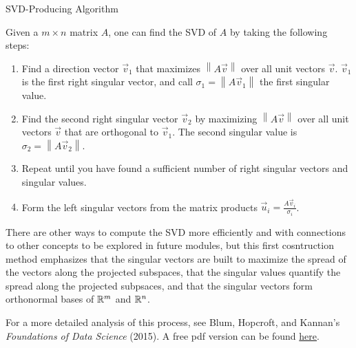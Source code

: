 \documentclass{ximera}
\begin{document}
\begin{theorem}{SVD-Producing Algorithm}

  Given a $m\times n$ matrix $A$, one can find the SVD of $A$ by taking the following steps:

  \begin{enumerate}
    \item Find a direction vector $\vec{v}_1$ that maximizes $\left\|A\vec{v}\right\|$ over all unit vectors $\vec{v}$. $\vec{v}_1$ is the first right singular vector, and call $\sigma_1=\left\|A\vec{v}_1\right\|$ the first singular value. 
    \item Find the second right singular vector $\vec{v}_2$ by maximizing $\left\|A\vec{v}\right\|$ over all unit vectors $\vec{v}$ that are orthogonal to $\vec{v}_1$. The second singular value is $\sigma_2=\left\|A\vec{v}_2\right\|$. 
    \item Repeat until you have found a sufficient number of right singular vectors and singular values.
    \item Form the left singular vectors from the matrix products $\vec{u}_i=\frac{A\vec{v}_i}{\sigma_i}$.
  \end{enumerate}

  There are other ways to compute the SVD more efficiently and with connections to other concepts to be explored in future modules, but this first cosntruction method emphasizes that the singular vectors are built to maximize the spread of the vectors along the projected subspaces, that the singular values quantify the spread along the projected subpsaces, and that the singular vectors form orthonormal bases of $\mathbb{R}^m$ and $\mathbb{R}^n$. 

  For a more detailed analysis of this process, see Blum, Hopcroft, and Kannan's \emph{Foundations of Data Science} (2015). A free pdf version can be found \href{https://www.cs.cornell.edu/jeh/book.pdf}{here}.

\end{theorem}
\end{document}

